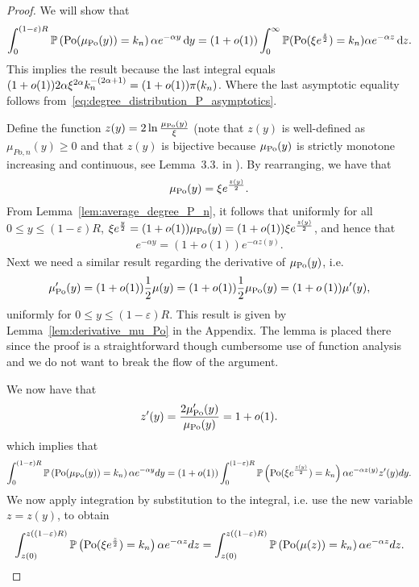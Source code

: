 \begin{proof}
We will show that
\[
	\int_0^{(1-\varepsilon)R} \mathbb{P}\left({\mathrm{Po}}(\mu_{{\mathrm{Po}}}(y)) = k_n\right) \alpha e^{-\alpha y} \operatorname{\mathrm{d}\hspace{-2pt}} y
	= (1+o(1))\int_0^\infty \mathbb{P}({\mathrm{Po}}(\xi e^{\frac{z}{2}})=k_n) \alpha e^{-\alpha z} \operatorname{\mathrm{d}\hspace{-2pt}} z.
\]
This implies the result because the last integral equals $(1+o(1))2\alpha \xi^{2\alpha} k_n^{-(2\alpha+1)} = (1+o(1)){\pi}(k_n)$. Where the last asymptotic equality follows from~\eqref{eq:degree_distribution_P_asymptotics}.

Define the function $z(y)=2\ln\frac{\mu_{{\mathrm{Po}}}(y)}{\xi}$ (note that $z(y)$ is well-defined as $\mu_{Po,n}(y)\geq 0$ and that $z(y)$ is bijective because $\mu_{{\mathrm{Po}}}(y)$ is strictly monotone increasing and continuous, see Lemma~3.3. in \cite{gugelmann2012random}). By rearranging, we have that
\begin{align*}
\mu_{{\mathrm{Po}}}(y) = \xi e^{\frac{z(y)}{2}}.
\end{align*}
From Lemma~\ref{lem:average_degree_P_n}, it follows that uniformly for all $0\leq y\leq (1-\varepsilon)R$, $\xi e^{\frac{y}{2}} = (1+o(1))\mu_{{\mathrm{Po}}}(y) = (1+o(1))\xi e^{\frac{z(y)}{2}}$, and hence that
\begin{align*}
e^{-\alpha y} = (1+o(1))e^{-\alpha z(y)}.
\end{align*}
Next we need a similar result regarding the derivative of $\mu_{{\mathrm{Po}}}(y)$, i.e.
\[
	\mu_{{\mathrm{Po}}}^\prime(y) = (1+o(1))\frac{1}{2}\mu(y) = (1+o(1))\frac{1}{2}\mu_{{\mathrm{Po}}}(y)
	= (1+o\left(1\right)) \mu^\prime(y),
\]
uniformly for $0 \leq  y \leq (1-\varepsilon)R$. This result is given by Lemma~\ref{lem:derivative_mu_Po} in the Appendix. The lemma is placed there since the proof is a straightforward though cumbersome use of function analysis and we do not want to break the flow of the argument.

We now have that
\[
	z^\prime(y) = \frac{2\mu_{{\mathrm{Po}}}^\prime(y)}{\mu_{{\mathrm{Po}}}(y)} = 1+o(1).
\]
which implies that
\begin{align*}
	\int_0^{(1-\varepsilon)R} \mathbb{P}\left({\mathrm{Po}}(\mu_{{\mathrm{Po}}}(y))=k_n\right) \alpha e^{-\alpha y}dy 
	= (1+o(1)) \int_0^{(1-\varepsilon)R} \mathbb{P}\left({\mathrm{Po}}(\xi e^{\frac{z(y)}{2}})=k_n\right)\alpha e^{-\alpha z(y)} z^\prime(y) dy.
\end{align*}
We now apply integration by substitution to the integral, i.e. use the new variable $z=z(y)$, to obtain 
\begin{align*}
	\int_{z(0)}^{z((1-\varepsilon)R)} \mathbb{P}\left({\mathrm{Po}}(\xi e^{\frac{z}{2}})=k_n\right)\alpha e^{-\alpha z} dz
	= \int_{z(0)}^{z((1-\varepsilon)R)} \mathbb{P}\left({\mathrm{Po}}(\mu(z))=k_n\right)\alpha e^{-\alpha z} dz.
\end{align*}



\end{proof}
